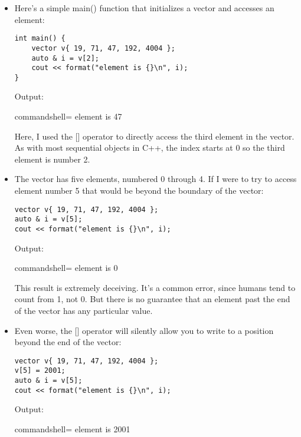 \begin{itemize}
\item 
Here's a simple main() function that initializes a vector and accesses an element:

\begin{lstlisting}[style=styleCXX]
int main() {
	vector v{ 19, 71, 47, 192, 4004 };
	auto & i = v[2];
	cout << format("element is {}\n", i);
}
\end{lstlisting}

Output:

\begin{tcblisting}{commandshell={}}
element is 47
\end{tcblisting}

Here, I used the [] operator to directly access the third element in the vector. As with most sequential objects in C++, the index starts at 0 so the third element is number 2.

\item 
The vector has five elements, numbered 0 through 4. If I were to try to access element number 5 that would be beyond the boundary of the vector:

\begin{lstlisting}[style=styleCXX]
vector v{ 19, 71, 47, 192, 4004 };
auto & i = v[5];
cout << format("element is {}\n", i);
\end{lstlisting}

Output:

\begin{tcblisting}{commandshell={}}
element is 0
\end{tcblisting}

This result is extremely deceiving. It's a common error, since humans tend to count from 1, not 0. But there is no guarantee that an element past the end of the vector has any particular value.

\item 
Even worse, the [] operator will silently allow you to write to a position beyond the end of the vector:

\begin{lstlisting}[style=styleCXX]
vector v{ 19, 71, 47, 192, 4004 };
v[5] = 2001;
auto & i = v[5];
cout << format("element is {}\n", i);
\end{lstlisting}

Output:

\begin{tcblisting}{commandshell={}}
element is 2001
\end{tcblisting}


\end{itemize}
